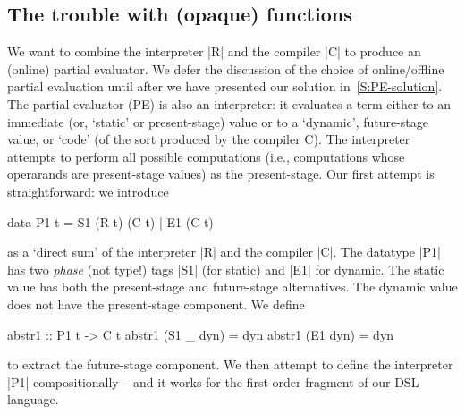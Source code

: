 \documentclass[preprint]{sigplanconf}
\begin{document}
\subsection{The trouble with (opaque) functions}
\label{S:PE-problem}
We want to combine the interpreter |R| and the compiler |C| to produce
an (online) partial evaluator.  We defer the discussion of the 
choice of online/offline partial evaluation until after we have presented our
solution in~\ref{S:PE-solution}.
The partial evaluator (PE) is also an interpreter: it
evaluates a term either to an immediate (or, `static' or present-stage)
value or to a `dynamic', future-stage value, or `code' (of the sort
produced by the compiler C). The interpreter attempts to perform all
possible computations (i.e., computations whose operarands are
present-stage values) as the present-stage. Our first attempt is
straightforward: we introduce
\begin{code}
data P1 t = S1 (R t) (C t) | E1 (C t)
\end{code}
as a `direct sum' of the interpreter |R| and the compiler |C|. The
datatype |P1| has two \emph{phase} (not type!) tags |S1| 
(for static) and |E1| for dynamic. The static value has both the
present-stage and future-stage alternatives. The dynamic value does
not have the present-stage component. We define
\begin{code}
abstr1 :: P1 t -> C t
abstr1 (S1 _ dyn) = dyn
abstr1 (E1 dyn)   = dyn
\end{code}
to extract the future-stage component. We then attempt to define the
interpreter |P1| compositionally -- and it works for the first-order
fragment of our DSL language.
\end{document}
